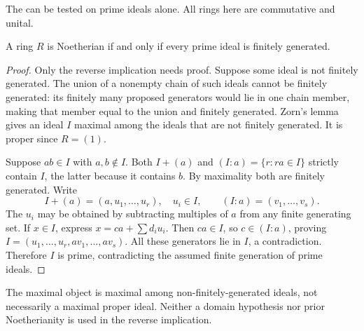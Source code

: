 The  can be
tested on prime ideals alone. All rings here are commutative and unital.

\begin{theorem}\label{cohen-criterion}
A ring $R$ is Noetherian if and only if every prime ideal is finitely generated.
\end{theorem}
\begin{proof}\label{cohen-criterion-proof}
Only the reverse implication needs proof. Suppose some ideal is not
finitely generated. The union of a nonempty chain of such ideals cannot
be finitely generated: its finitely many proposed generators would lie
in one chain member, making that member equal to the union and finitely
generated. Zorn's lemma gives an ideal $I$ maximal among the ideals that
are not finitely generated. It is proper since $R=(1)$.

Suppose $ab\in I$ with $a,b\notin I$. Both $I+(a)$ and
$(I:a)=\{r:ra\in I\}$ strictly contain $I$, the latter because it
contains $b$. By maximality both are finitely generated. Write
\[
 I+(a)=(a,u_1,\ldots,u_r),\quad u_i\in I,
 \qquad (I:a)=(v_1,\ldots,v_s).
\]
The $u_i$ may be obtained by subtracting multiples of $a$ from any
finite generating set. If $x\in I$, express $x=ca+\sum d_iu_i$.
Then $ca\in I$, so $c\in(I:a)$, proving
$I=(u_1,\ldots,u_r,av_1,\ldots,av_s)$.
All these generators lie in $I$, a contradiction. Therefore $I$ is
prime, contradicting the assumed finite generation of prime ideals.
\end{proof}
\begin{remark}\label{cohen-scope}
The maximal object is maximal among non-finitely-generated ideals, not
necessarily a maximal proper ideal. Neither a domain hypothesis nor
prior Noetherianity is used in the reverse implication.
\end{remark}
